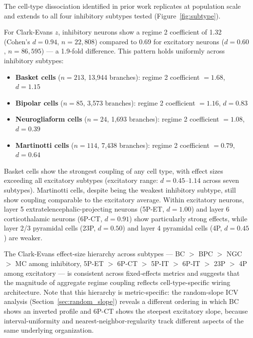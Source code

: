 \documentclass[11pt]{article}
\begin{document}
The cell-type dissociation identified in prior work \citep{voruganti2026coupling} replicates at population scale and extends to all four inhibitory subtypes tested (Figure~\ref{fig:subtype}).

For Clark-Evans $z$, inhibitory neurons show a regime 2 coefficient of 1.32 (Cohen's $d = 0.94$, $n = 22{,}808$) compared to 0.69 for excitatory neurons ($d = 0.60$, $n = 86{,}595$) --- a 1.9-fold difference. This pattern holds uniformly across inhibitory subtypes:

\begin{itemize}
    \item \textbf{Basket cells} ($n = 213$, 13{,}944 branches): regime 2 coefficient $= 1.68$, $d = 1.15$
    \item \textbf{Bipolar cells} ($n = 85$, 3{,}573 branches): regime 2 coefficient $= 1.16$, $d = 0.83$
    \item \textbf{Neurogliaform cells} ($n = 24$, 1{,}693 branches): regime 2 coefficient $= 1.08$, $d = 0.39$
    \item \textbf{Martinotti cells} ($n = 114$, 7{,}438 branches): regime 2 coefficient $= 0.79$, $d = 0.64$
\end{itemize}

Basket cells show the strongest coupling of any cell type, with effect sizes exceeding all excitatory subtypes (excitatory range: $d = 0.45$--$1.14$ across seven subtypes). Martinotti cells, despite being the weakest inhibitory subtype, still show coupling comparable to the excitatory average. Within excitatory neurons, layer 5 extratelencephalic-projecting neurons (5P-ET, $d = 1.00$) and layer 6 corticothalamic neurons (6P-CT, $d = 0.91$) show particularly strong effects, while layer 2/3 pyramidal cells (23P, $d = 0.50$) and layer 4 pyramidal cells (4P, $d = 0.45$) are weaker.

The Clark-Evans effect-size hierarchy across subtypes --- BC $>$ BPC $>$ NGC $>$ MC among inhibitory, 5P-ET $>$ 6P-CT $>$ 5P-IT $>$ 6P-IT $>$ 23P $>$ 4P among excitatory --- is consistent across fixed-effects metrics and suggests that the magnitude of aggregate regime coupling reflects cell-type-specific wiring architecture. Note that this hierarchy is metric-specific: the random-slope ICV analysis (Section~\ref{sec:random_slope}) reveals a different ordering in which BC shows an inverted profile and 6P-CT shows the steepest excitatory slope, because interval-uniformity and nearest-neighbor-regularity track different aspects of the same underlying organization.
\end{document}
